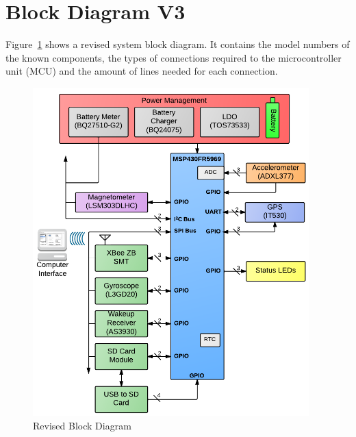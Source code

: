 \section{Block Diagram V3}

Figure~\ref{fig:blockDiagram} shows a revised system block diagram.  It contains the model numbers of the known components, the types of connections required to the microcontroller unit (MCU) and the amount of lines needed for each connection.

\begin{figure}[H]
	\centering
	\includegraphics[width=0.95\textwidth]{img/blockDiagramV3}
	\caption{Revised Block Diagram \label{fig:blockDiagram}}
\end{figure}


